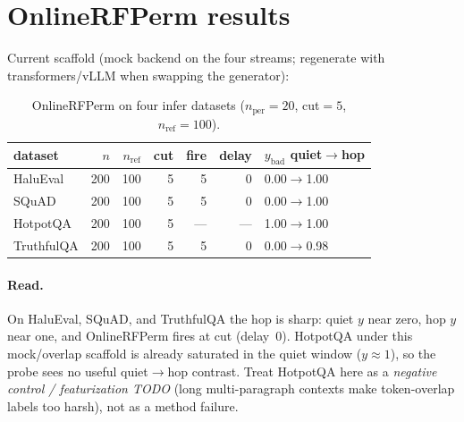 \documentclass[11pt]{article}
\begin{document}
\section{OnlineRFPerm results}
Current scaffold (mock backend on the four streams; regenerate with
transformers/vLLM when swapping the generator):

\begin{table}[h]
\centering
\caption{OnlineRFPerm on four infer datasets
($n_{\mathrm{per}}=20$, cut$=5$, $n_{\mathrm{ref}}=100$).}
\begin{tabular}{lrrrrrl}
\toprule
dataset & $n$ & $n_{\mathrm{ref}}$ & cut & fire & delay & $y_{\mathrm{bad}}$ quiet$\to$hop \\
\midrule
HaluEval   & 200 & 100 & 5 & 5   & 0   & 0.00$\to$1.00 \\
SQuAD      & 200 & 100 & 5 & 5   & 0   & 0.00$\to$1.00 \\
HotpotQA   & 200 & 100 & 5 & --- & --- & 1.00$\to$1.00 \\
TruthfulQA & 200 & 100 & 5 & 5   & 0   & 0.00$\to$0.98 \\
\bottomrule
\end{tabular}
\end{table}

\paragraph{Read.}
On HaluEval, SQuAD, and TruthfulQA the hop is sharp: quiet $y$ near zero, hop
$y$ near one, and OnlineRFPerm fires at cut (delay~$0$).
HotpotQA under this mock/overlap scaffold is already saturated in the quiet
window ($y\approx 1$), so the probe sees no useful quiet$\to$hop contrast.
Treat HotpotQA here as a \emph{negative control / featurization TODO}
(long multi-paragraph contexts make token-overlap labels too harsh), not as a
method failure.
\end{document}
